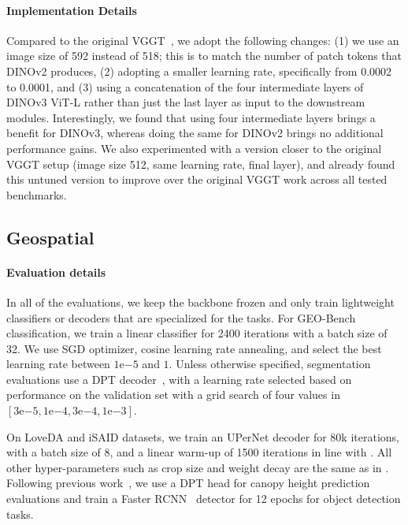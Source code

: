 \paragraph{Implementation Details}
Compared to the original VGGT~\citep{wang2025vggt}, we adopt the following changes:
(1) we use an image size of 592 instead of 518; this is to match the number of patch tokens that DINOv2 produces,
(2) adopting a smaller learning rate, specifically from 0.0002 to 0.0001, and 
(3) using a concatenation of the four intermediate layers of DINOv3 ViT-L rather than just the last layer as input to the downstream modules.
Interestingly, we found that using four intermediate layers brings a benefit for DINOv3, whereas doing the same for DINOv2 brings no additional performance gains.
We also experimented with a version closer to the original VGGT setup (image size 512, same learning rate, final layer), and already found this untuned version to improve over the original VGGT work across all tested benchmarks.










\subsection{Geospatial}
\label{app:exp-details:geospatial}
\paragraph{Evaluation details} %

In all of the evaluations, we keep the backbone frozen and only train lightweight classifiers or decoders that are specialized for the tasks.
For GEO-Bench classification, we train a linear classifier for 2400 iterations with a batch size of 32. We use SGD optimizer, cosine learning rate annealing, and select the best learning rate between $1\mathrm{e}{-5}$ and $1$. Unless otherwise specified, segmentation evaluations use a DPT decoder~\citep{ranftl2021vision}, with a learning rate selected based on performance on the validation set with a grid search of four values in $[3\mathrm{e}{-5}, 1\mathrm{e}{-4}, 3\mathrm{e}{-4}, 1\mathrm{e}{-3}]$.   

On LoveDA and iSAID datasets, we train an UPerNet decoder \citep{xiao2018unifiedperceptualparsingscene} for 80k iterations, with a batch size of 8, and a linear warm-up of 1500 iterations in line with \citep{wang2024mtpadvancingremotesensing}.
All other hyper-parameters such as crop size and weight decay are the same as in \citep{wang2024mtpadvancingremotesensing}.
Following previous work~\citep{tolan2024very,wang2022lovedaremotesensinglandcover}, we use a DPT head for canopy height prediction evaluations and train a Faster RCNN~\citep{ren2015faster} detector for 12 epochs for object detection tasks.

